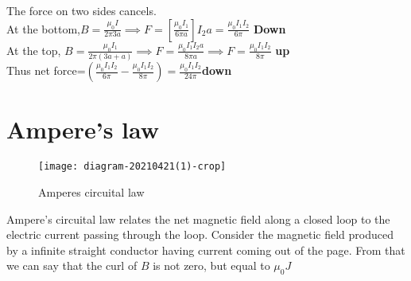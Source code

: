 \begin{answer}
The force on two sides cancels.\\
At the bottom,$B=\frac{\mu_{0} I}{2\pi 3a} \implies F=\left[ \frac{\mu_{0} I_1}{6\pi a}\right] 	I_2a=\frac{\mu_{0} I_1I_2}{6\pi}$ \textbf{Down}\\
At the top, $B=\frac{\mu_{0}I_1}{2\pi(3a+a)}\implies F=\frac{\mu_{0}I_1I_2a}{8\pi a}\implies F=\frac{\mu_{0}I_1I_2}{8\pi}$ \textbf{up}\\
Thus net force=$\left( \frac{\mu_{0}I_1I_2}{6\pi}-\frac{\mu_{0}I_1I_2}{8\pi}\right) =\frac{\mu_{0}I_1I_2}{24\pi}$\textbf{down}
\end{answer}
\section{Ampere's law}
 \begin{wrapfigure}{r}{0.35\textwidth}
	\begin{center}
		\texttt{[image: diagram-20210421(1)-crop]}
	\end{center}
	\caption{Amperes circuital law}
\end{wrapfigure}
Ampere's circuital law relates the net magnetic field along a closed loop to the electric current passing through the loop.
Consider the magnetic field produced by a infinite straight conductor having current coming out of the page. From that we can say that the curl of $B$ is not zero, but equal to $\mu_0J$

